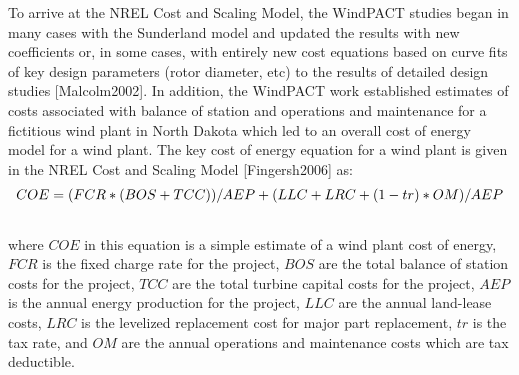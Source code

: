 \documentclass[letterpaper,10pt,openany,oneside]{sphinxmanual}
\begin{document}
To arrive at the NREL Cost and Scaling Model, the WindPACT studies began in many cases with the Sunderland model and updated the results with new coefficients or, in some cases, with entirely new cost equations based on curve fits of key design parameters (rotor diameter, etc) to the results of detailed design studies {[}Malcolm2002{]}.  In addition, the WindPACT work established estimates of costs associated with balance of station and operations and maintenance for a fictitious wind plant in North Dakota which led to an overall cost of energy model for a wind plant.  The key cost of energy equation for a wind plant is given in the NREL Cost and Scaling Model {[}Fingersh2006{]} as:
\begin{gather}
\begin{split}COE = (FCR*(BOS+TCC))/AEP + (LLC + LRC + (1-tr)*OM)/AEP\end{split}\notag\\\begin{split}\end{split}\notag
\end{gather}
where $COE$ in this equation is a simple estimate of a wind plant cost of energy, $FCR$ is the fixed charge rate for the project, $BOS$ are the total balance of station costs for the project, $TCC$ are the total turbine capital costs for the project, $AEP$ is the annual energy production for the project, $LLC$ are the annual land-lease costs, $LRC$ is the levelized replacement cost for major part replacement, $tr$ is the tax rate, and $OM$ are the annual operations and maintenance costs which are tax deductible.
\end{document}
